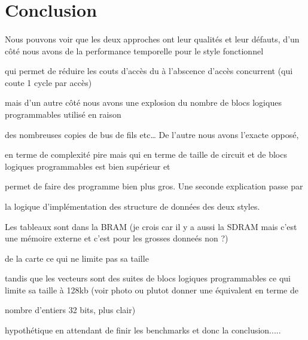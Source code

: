 \documentclass{article}
\begin{document}

\newpage

\section{Conclusion}

\paragraph{} Nous pouvons voir que les deux approches ont leur qualités et leur défauts, d’un côté nous avons de la performance temporelle pour le style fonctionnel 

qui permet de réduire les couts d’accès du à l’abscence d’accès concurrent (qui coute 1 cycle par accès) 

mais d’un autre côté nous avons une explosion du nombre de blocs logiques programmables utilisé en raison 

des nombreuses copies de bus de fils etc… De l’autre nous avons l’exacte opposé, 

en terme de complexité pire mais qui en terme de taille de circuit et de blocs logiques programmables est bien supérieur et 

permet de faire des programme bien plus gros. Une seconde explication passe par 

la logique d’implémentation des structure de données des deux styles. 

Les tableaux sont dans la BRAM (je crois car il y a aussi la SDRAM mais c'est une mémoire externe et c'est pour les grosses donneés non ?) 

de la carte ce qui ne limite pas sa taille 

tandis que les vecteurs sont des suites de blocs logiques programmables ce qui limite sa taille à 128kb (voir photo ou plutot donner une équivalent en terme de 

nombre d'entiers 32 bits, plus clair)

hypothétique en attendant de finir les benchmarks et donc la conclusion.....





\newpage

     




\newpage

\appendix
\end{document}
